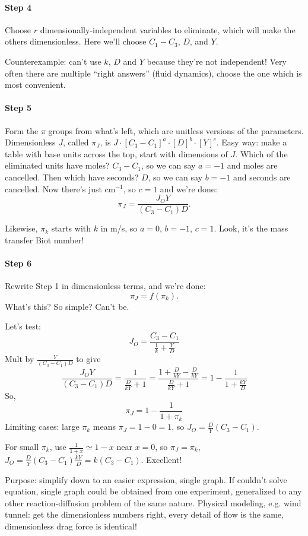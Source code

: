 \documentclass{report}
\begin{document}
\paragraph{Step 4} Choose $r$ dimensionally-independent variables to eliminate,
which will make the others dimensionless.  Here we'll choose $C_1-C_3$, $D$,
and $Y$.

Counterexample: can't use $k$, $D$ and $Y$ because they're not independent!
Very often there are multiple ``right answers'' (fluid dynamics), choose the
one which is most convenient.

\paragraph{Step 5}  Form the $\pi$ groups from what's left, which are unitless
versions of the parameters.  Dimensionless $J$, called $\pi_J$, is $J \cdot
[C_3-C_1]^a \cdot [D]^b \cdot [Y]^c$.  Easy way: make a table with base units
across the top, start with dimensions of $J$.  Which of the eliminated units
have moles?  $C_3-C_1$, so we can say $a=-1$ and moles are cancelled.  Then
which have seconds?  $D$, so we can say $b=-1$ and seconds are cancelled.  Now
there's just cm$^{-1}$, so $c=1$ and we're done:
$$\pi_J = \frac{J_O Y}{(C_3-C_1) D}.$$

Likewise, $\pi_k$ starts with $k$ in m/s, so $a=0$, $b=-1$, $c=1$.  Look, it's
the mass transfer Biot number!

\paragraph{Step 6} Rewrite Step 1 in dimensionless terms, and we're done:
$$\pi_J = f(\pi_k).$$
What's this?  So simple?  Can't be.

Let's test:
$$J_O=\frac{C_3-C_1}{\frac{1}{k} + \frac{Y}{D}}$$
Mult by $\frac{Y}{(C_3-C_1)D}$ to give
$$\frac{J_O Y}{(C_3-C_1)D} = \frac{1}{\frac{D}{kY} + 1} =
\frac{1 + \frac{D}{kY} - \frac{D}{kY}}{\frac{D}{kY} + 1} =
1 - \frac{1}{1+\frac{kY}{D}}$$
So,
$$\pi_J = 1 - \frac{1}{1+\pi_k}$$
Limiting cases: large $\pi_k$ means $\pi_J = 1-0 = 1$, so $J_O =
\frac{D}{Y}(C_3-C_1)$.

For small $\pi_k$, use $\frac{1}{1+x}\simeq1-x$ near $x=0$, so $\pi_J = \pi_k$,
$J_O = \frac{D}{Y}(C_3-C_1)\frac{kY}{D} = k(C_3-C_1)$.  Excellent!

Purpose: simplify down to an easier expression, single graph.  If couldn't
solve equation, single graph could be obtained from one experiment, generalized
to any other reaction-diffusion problem of the same nature.  Physical modeling,
e.g. wind tunnel: get the dimensionless numbers right, every detail of flow is
the same, dimensionless drag force is identical!
\end{document}
